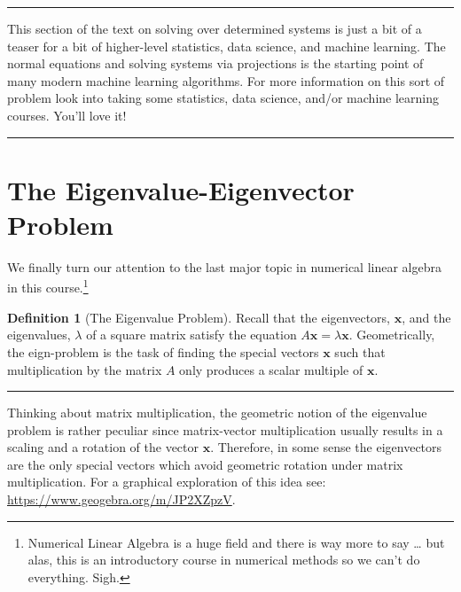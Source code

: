 \documentclass[
]{book}
\theoremstyle{definition}
\newtheorem{definition}{Definition}[chapter]
\theoremstyle{definition}
\theoremstyle{definition}
\theoremstyle{remark}
\begin{document}
\begin{center}\rule{0.5\linewidth}{0.5pt}\end{center}

This section of the text on solving over determined systems is just a bit of a teaser for a bit of higher-level statistics, data science, and machine learning. The normal equations and solving systems via projections is the starting point of many modern machine learning algorithms. For more information on this sort of problem look into taking some statistics, data science, and/or machine learning courses. You'll love it!

\begin{center}\rule{0.5\linewidth}{0.5pt}\end{center}

\hypertarget{the-eigenvalue-eigenvector-problem}{%
\section{The Eigenvalue-Eigenvector Problem}\label{the-eigenvalue-eigenvector-problem}}

We finally turn our attention to the last major topic in numerical linear algebra in this course.\footnote{Numerical Linear Algebra is a huge field and there is way more to say \ldots{} but alas, this is an introductory course in numerical methods so we can't do everything. Sigh.}

\begin{definition}[The Eigenvalue Problem]
\protect\hypertarget{def:eig}{}{\label{def:eig} {} }Recall that the eigenvectors, \(\boldsymbol{x}\), and the eigenvalues, \(\lambda\) of a
square matrix satisfy the equation \(A\boldsymbol{x}=\lambda \boldsymbol{x}\). Geometrically, the eign-problem is the task of finding the special vectors \(\boldsymbol{x}\) such that multiplication by the matrix \(A\) only produces a scalar multiple of \(\boldsymbol{x}\).
\end{definition}

\begin{center}\rule{0.5\linewidth}{0.5pt}\end{center}

Thinking about matrix multiplication, the geometric notion of the eigenvalue problem is rather peculiar since matrix-vector multiplication usually results in a scaling and a
rotation of the vector \(\boldsymbol{x}\). Therefore, in some sense the eigenvectors are
the only special vectors which avoid geometric rotation under matrix
multiplication. For a graphical exploration of this idea see:\\
\url{https://www.geogebra.org/m/JP2XZpzV}.
\end{document}
